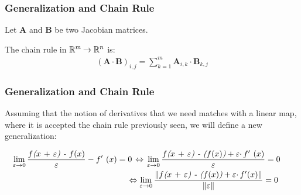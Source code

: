 \documentclass{beamer}
\theoremstyle{definition}
\theoremstyle{definition}
\theoremstyle{theorem}
\def\R{\mathbb{R}}
\newcommand{\norm}[1]{\left\lVert#1\right\rVert}
\begin{document}
\begin{frame}
\frametitle{Generalization and Chain Rule}
\vspace{15mm}
Let $\mathbf{A}$ and $\mathbf{B}$ be two Jacobian matrices. 

The chain rule in $\R^{m}\hspace{-0.3mm}\to \R^{n}$ is:
\begin{align*}
(\mathbf{A} \cdotp \mathbf{B})_{i,j}= \sum_{k=1}^{m} \mathbf{A}_{i,k} \cdotp \mathbf{B}_{k,j}
\end{align*}
\end{frame}
\begin{frame}
\frametitle{Generalization and Chain Rule}
\vspace{15mm}
Assuming that the notion of derivatives that we need matches with a linear map, where it is accepted the chain rule previously seen, we will define a new generalization:
\pause

\begin{align*}
\hspace{-2mm} \lim_{\varepsilon \to 0} \frac{\textit{$f$($x$ $+$ $\varepsilon$) - $f(x)$}}{\varepsilon} - \textit{$f $$'$ $(x)$} = 0 \hspace{0.5mm} 
\Leftrightarrow \hspace{0.5mm} \lim_{\varepsilon \to 0} \frac{\textit{$f$($x$ $+$ $\varepsilon$) - ($f(x)$)} + \varepsilon \cdotp \textit{$f $$'$ $(x)$}}{\varepsilon} = 0 \\
& 
\hspace{-6.6cm}  \Leftrightarrow  
\lim_{\varepsilon \to 0} 
\frac{
\norm{ \textit{$f$($x$ $+$ $\varepsilon$) - ($f(x)$)} + \varepsilon \cdotp \textit{$f'(x)$} } 
}{
\norm{ \varepsilon }
} 
= 0
\end{align*}

\end{frame}
\end{document}

